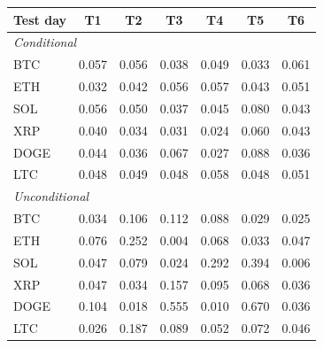 \begin{tabular}{lcccccc}
\toprule
Test day & T1 & T2 & T3 & T4 & T5 & T6 \\
\midrule
\multicolumn{7}{l}{\emph{Conditional}} \\
BTC & 0.057 & 0.056 & 0.038 & 0.049 & 0.033 & 0.061 \\
ETH & 0.032 & 0.042 & 0.056 & 0.057 & 0.043 & 0.051 \\
SOL & 0.056 & 0.050 & 0.037 & 0.045 & 0.080 & 0.043 \\
XRP & 0.040 & 0.034 & 0.031 & 0.024 & 0.060 & 0.043 \\
DOGE & 0.044 & 0.036 & 0.067 & 0.027 & 0.088 & 0.036 \\
LTC & 0.048 & 0.049 & 0.048 & 0.058 & 0.048 & 0.051 \\
\multicolumn{7}{l}{\emph{Unconditional}} \\
BTC & 0.034 & 0.106 & 0.112 & 0.088 & 0.029 & 0.025 \\
ETH & 0.076 & 0.252 & 0.004 & 0.068 & 0.033 & 0.047 \\
SOL & 0.047 & 0.079 & 0.024 & 0.292 & 0.394 & 0.006 \\
XRP & 0.047 & 0.034 & 0.157 & 0.095 & 0.068 & 0.036 \\
DOGE & 0.104 & 0.018 & 0.555 & 0.010 & 0.670 & 0.036 \\
LTC & 0.026 & 0.187 & 0.089 & 0.052 & 0.072 & 0.046 \\
\bottomrule
\end{tabular}
